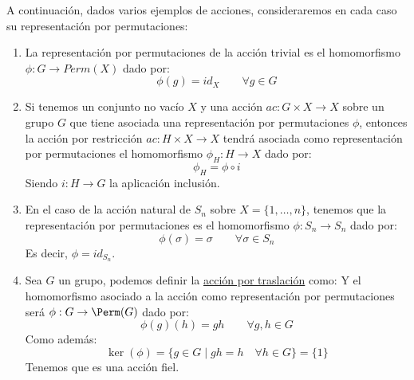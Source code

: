 \begin{ejemplo}
    A continuación, dados varios ejemplos de acciones, consideraremos en cada caso su representación por permutaciones:
    \begin{enumerate}
        \item La representación por permutaciones de la acción trivial es el homomorfismo $\phi:G\to Perm(X)$ dado por:
            \begin{equation*}
                \phi(g) = id_X \qquad \forall g\in G
            \end{equation*}
        \item Si tenemos un conjunto no vacío $X$ y una acción $ac:G\times X\to X$ sobre un grupo $G$ que tiene asociada una representación por permutaciones $\phi$, entonces la acción por restricción $ac:H\times X\to X$ tendrá asociada como representación por permutaciones el homomorfismo $\phi_H:H\to X$ dado por:
            \begin{equation*}
                \phi_H = \phi \circ i 
            \end{equation*}
            Siendo $i:H\to G$ la aplicación inclusión.
        \item En el caso de la acción natural de $S_n$ sobre $X =\{1,\ldots,n\} $, tenemos que la representación por permutaciones es el homomorfismo $\phi:S_n\to S_n$ dado por:
            \begin{equation*}
                \phi(\sigma) = \sigma \qquad \forall \sigma\in S_n
            \end{equation*}
            Es decir, $\phi = id_{S_n}$.
        \item Sea $G$ un grupo, podemos definir la \underline{acción por traslación} como:
            Y el homomorfismo asociado a la acción como representación por permutaciones será $\phi:G\to \Perm(G)$ dado por:
            \begin{equation*}
                \phi(g)(h) = gh \qquad \forall g,h\in G
            \end{equation*}
            Como además:
            \begin{equation*}
                \ker(\phi) = \{g\in G\mid gh = h \quad \forall h\in G\} = \{1\}
            \end{equation*}
            Tenemos que es una acción fiel.
    \end{enumerate}
\end{ejemplo}


